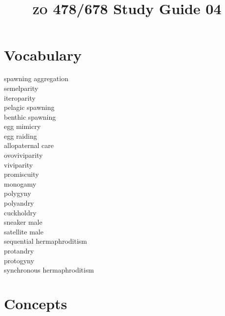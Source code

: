 \documentclass[letterpaper]{tufte-handout}
\title{{\scshape zo} 478/678 Study Guide 04}
\date{} %
\begin{document}
\maketitle	%


\section{Vocabulary} 
\vspace{-1\baselineskip}
\begin{multicols}{2}
spawning aggregation \\
semelparity \\
iteroparity \\
pelagic spawning \\
benthic spawning \\
egg mimicry \\
egg raiding \\
allopaternal care \\
ovoviviparity \\
viviparity \\
promiscuity \\
monogamy \\
polygyny \\
polyandry \\
cuckholdry \\
sneaker male \\
satellite male \\
sequential hermaphroditism \\
protandry \\
protogyny \\
synchronous hermaphroditism 
\end{multicols}

\section{Concepts}
\end{document}
